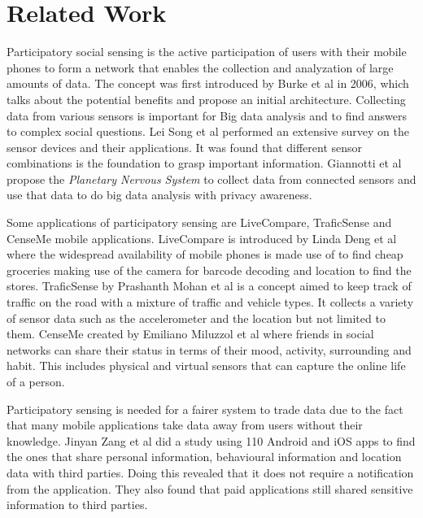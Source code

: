 \chapter{Related Work}

Participatory social sensing is the active participation of users with their mobile phones to form a network that enables the collection and analyzation of large amounts of data.
The concept was first introduced by Burke et al in 2006, which talks about the potential benefits and propose an initial architecture. Collecting data from various sensors is important for Big data analysis and to find answers to complex social questions. Lei Song et al \cite{song2014health} performed an extensive survey on the sensor devices and their applications. It was found that different sensor combinations is the foundation to grasp important information. Giannotti et al \cite{giannotti2012planetary} propose the \textit{Planetary Nervous System} to collect data from connected sensors and use that data to do big data analysis with privacy awareness.

Some applications of participatory sensing are LiveCompare, TraficSense and CenseMe mobile applications. LiveCompare is introduced by Linda Deng et al
\cite{deng2009livecompare} where the widespread availability of mobile phones is made use of to find cheap groceries making use of the camera for barcode decoding and location to find the stores. TraficSense by Prashanth Mohan et al \cite{mohan2008nericell} is a concept aimed to keep track of traffic on the road with a mixture of traffic and vehicle types. It collects a variety of sensor data such as the accelerometer and the location but not limited to them. CenseMe created by Emiliano Miluzzol et al \cite{miluzzo2007cenceme} where friends in social networks can share their status in terms of their mood, activity, surrounding and habit. This includes physical and virtual sensors that can capture the online life of a person. 

Participatory sensing is needed for a fairer system to trade data due to the fact that many mobile applications take data away from users without their knowledge. Jinyan Zang et al
\cite{zang2015knows} did a study using 110 Android and iOS apps to find the ones that share personal information, behavioural information and location data with third parties. Doing this revealed that it does not require a notification from the application. They also found that paid applications still shared sensitive information to third parties. 

